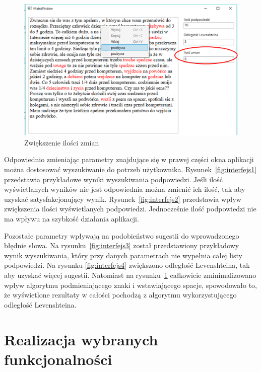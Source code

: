 \begin{figure} [H]
	\centering
	\includegraphics[width=1\linewidth]{rozdzial03/screen6_1.png}
	\caption{Zwiększenie ilości zmian}
	\label{fig:interfejs5}
\end{figure}

Odpowiednio zmieniając parametry znajdujące się w prawej części okna aplikacji można dostosować wyszukiwanie do potrzeb użytkownika. Rysunek~\ref{fig:interfejs1} przedstawia przykładowe wyniki wyszukiwania podpowiedzi. Jeśli ilość wyświetlanych wyników nie jest odpowiednia można zmienić ich ilość, tak aby uzyskać satysfakcjonujący wynik. Rysunek~\ref{fig:interfejs2} przedstawia wpływ zwiększenia ilości wyświetlanych podpowiedzi. Jednocześnie ilość podpowiedzi nie ma wpływu na szybkość działania aplikacji. 

Pozostałe parametry wpływają na podobieństwo sugestii do wprowadzonego błędnie słowa. Na rysunku~\ref{fig:interfejs3} został przedstawiony przykładowy wynik wyszukiwania, który przy danych parametrach nie wypełnia całej listy podpowiedzi. Na rysunku \ref{fig:interfejs4} zwiększono odległość Levenshteina, tak aby uzyskać więcej sugestii. Natomiast na rysunku~\ref{fig:interfejs5} całkowicie zminimalizowano wpływ algorytmu podmieniającego znaki i wstawiającego spacje, spowodowało to, że wyświetlone rezultaty w całości pochodzą z algorytmu wykorzystującego odległość Levenshteina.
 
\section{Realizacja wybranych funkcjonalności}

